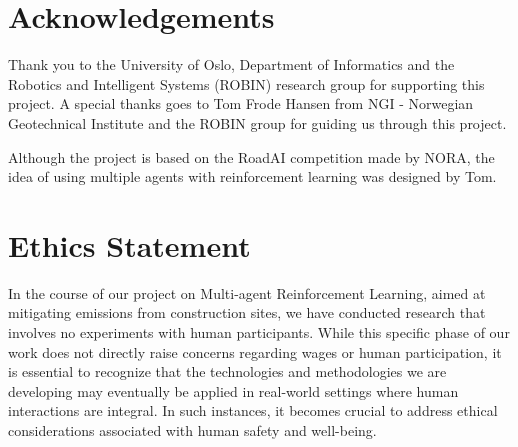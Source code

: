 \documentclass[conference]{IEEEtran}
\begin{document}




\section{Acknowledgements}
Thank you to the University of Oslo, Department of Informatics and the Robotics and
Intelligent Systems (ROBIN) research group for supporting this project. A special thanks goes to
Tom Frode Hansen from NGI - Norwegian Geotechnical Institute and the ROBIN group for guiding us through
this project.

Although the project is based on the RoadAI competition made by NORA, the idea of using multiple
agents with reinforcement learning was designed by Tom.




\section{Ethics Statement}
In the course of our project on Multi-agent Reinforcement Learning, aimed at mitigating \coo{} emissions
from construction sites, we have conducted research that involves no experiments with human participants.
While this specific phase of our work does not directly raise concerns regarding wages or human
participation, it is essential to recognize that the technologies and methodologies we are developing
may eventually be applied in real-world settings where human interactions are integral. In such instances,
it becomes crucial to address ethical considerations associated with human safety and well-being.
\end{document}

